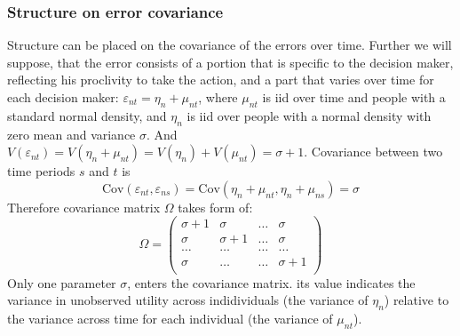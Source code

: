 \documentclass[11pt,a4paper]{article}
\newcommand{\Cov}{\text{Cov}}
\begin{document}
\subsubsection*{Structure on error covariance}
Structure can be placed on the covariance of the errors over time.
Further we will suppose, that the error consists of a portion that
is specific to the decision maker, reflecting his proclivity to
take the action, and a part that varies over time for each
decision maker: $ \varepsilon_{nt} = \eta_{n} + \mu_{nt} $,
where $ \mu_{nt} $  is iid over time and people with a
standard normal density, and $ \eta_n $ is iid over people
with a normal density with zero mean and variance $ \sigma $.
And $ V(\varepsilon_{nt}) = V(\eta_{n} + \mu_{nt}) = V(\eta_n) + V(\mu_{nt}) =
    \sigma +1 $. Covariance between two time periods $ s $ and $ t $
is
$$ \Cov(\varepsilon_{nt}, \varepsilon_{ns}) =
    \Cov(\eta_{n} + \mu_{nt}, \eta_{n} + \mu_{ns})= \sigma $$
Therefore covariance matrix $ \Omega $ takes form of:
$$
    \Omega = \begin{pmatrix*}
        \sigma + 1 & \sigma & \dots & \sigma \\
        \sigma  & \sigma + 1 & \dots & \sigma \\
        \dots  & \dots & \dots & \dots \\
        \sigma  & \dots & \dots & \sigma + 1 \\
    \end{pmatrix*}
$$
Only one parameter $ \sigma $, enters the covariance matrix.
its value indicates the variance in unobserved utility across
indidividuals (the variance of $ \eta_n $)
relative to the variance across time for each individual
(the variance of $ \mu_{nt} $).
\end{document}
